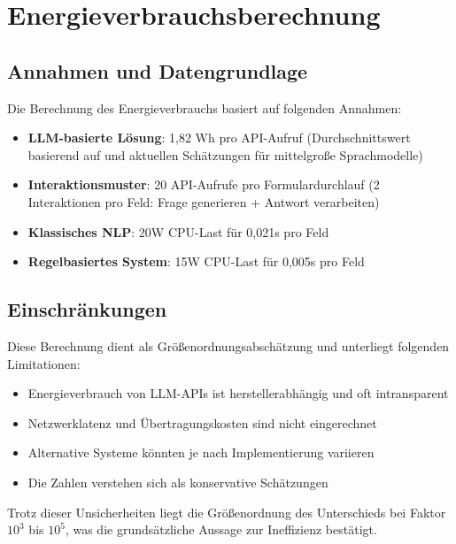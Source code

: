 \chapter{Energieverbrauchsberechnung}
\label{app:energieberechnung}

\section{Annahmen und Datengrundlage}

Die Berechnung des Energieverbrauchs basiert auf folgenden Annahmen:

\begin{itemize}
    \item \textbf{LLM-basierte Lösung}: 1,82 Wh pro API-Aufruf 
          (Durchschnittswert basierend auf \cite{strubellEnergyPolicyConsiderations2019} 
          und aktuellen Schätzungen für mittelgroße Sprachmodelle)
    \item \textbf{Interaktionsmuster}: 20 API-Aufrufe pro Formulardurchlauf 
          (2 Interaktionen pro Feld: Frage generieren + Antwort verarbeiten)
    \item \textbf{Klassisches NLP}: 20W CPU-Last für 0,021s pro Feld
    \item \textbf{Regelbasiertes System}: 15W CPU-Last für 0,005s pro Feld
\end{itemize}

\section{Einschränkungen}

Diese Berechnung dient als Größenordnungsabschätzung und unterliegt folgenden Limitationen:

\begin{itemize}
    \item Energieverbrauch von LLM-APIs ist herstellerabhängig und oft intransparent
    \item Netzwerklatenz und Übertragungskosten sind nicht eingerechnet
    \item Alternative Systeme könnten je nach Implementierung variieren
    \item Die Zahlen verstehen sich als konservative Schätzungen
\end{itemize}

Trotz dieser Unsicherheiten liegt die Größenordnung des Unterschieds bei Faktor $10^3$ bis $10^5$, was die grundsätzliche Aussage zur Ineffizienz bestätigt.